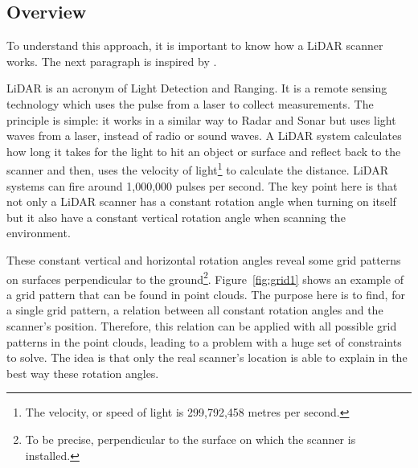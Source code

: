 \subsection{Overview}
To understand this approach, it is important to know how a LiDAR scanner works. The next paragraph is inspired by \cite{lidar}.

LiDAR is an acronym of Light Detection and Ranging. It is a remote sensing technology which uses the pulse from a laser to collect measurements. The principle is simple: it works in a similar way to Radar and Sonar but uses light waves from a laser, instead of radio or sound waves. A LiDAR system calculates how long it takes for the light to hit an object or surface and reflect back to the scanner and then, uses the velocity of light\footnote{The velocity, or speed of light is 299,792,458 metres per second.} to calculate the distance. LiDAR systems can fire around 1,000,000 pulses per second. The key point here is that not only a LiDAR scanner has a constant rotation angle when turning on itself but it also have a constant vertical rotation angle when scanning the environment.

These constant vertical and horizontal rotation angles reveal some grid patterns on surfaces perpendicular to the ground\footnote{To be precise, perpendicular to the surface on which the scanner is installed.}. Figure~\ref{fig:grid1} shows an example of a grid pattern that can be found in point clouds. The purpose here is to find, for a single grid pattern, a relation between all constant rotation angles and the scanner's position. Therefore, this relation can be applied with all possible grid patterns in the point clouds, leading to a problem with a huge set of
constraints to solve. The idea is that only the real scanner's location is able to explain in the best way these rotation angles.

